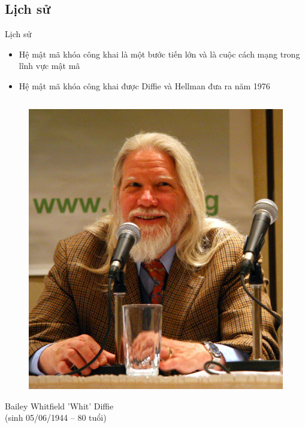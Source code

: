 \documentclass{beamer}
\begin{document}
\subsection{Lịch sử}
\begin{frame}{Lịch sử}

\begin{itemize}
\item Hệ mật mã khóa công khai là một bước tiến lớn và là cuộc cách mạng trong lĩnh vực mật mã
\item Hệ mật mã khóa công khai được Diffie và Hellman đưa ra năm 1976
\end{itemize}

\begin{columns}

\begin{column}{0.4\textwidth}
\begin{figure}[H]
\centering
\includegraphics[scale = 0.4]{pictures/Bailey_Whitfield_Diffie.png}
\end{figure}
Bailey Whitfield 'Whit' Diffie\\ (sinh 05/06/1944 – 80 tuổi)
\end{column}


\end{columns}
\end{frame}
\end{document}
